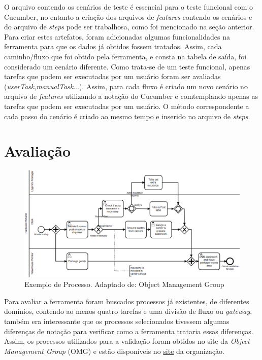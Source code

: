 \documentclass[12pt]{article}
\begin{document}
O arquivo contendo os cenários de teste é essencial para o teste funcional com o Cucumber, no entanto a criação dos arquivos de \emph{features} contendo os cenários e do arquivo de \emph{steps} pode ser trabalhosa, como foi mencionado na seção anterior. Para criar estes artefatos, foram adicionadas algumas funcionalidades na ferramenta para que os dados já obtidos fossem tratados. Assim, cada caminho/fluxo que foi obtido pela ferramenta, e consta na tabela de saída, foi considerado um cenário diferente. Como trata-se de um teste funcional, apenas tarefas que podem ser executadas por um usuário foram ser avaliadas (\emph{userTask},\emph{manualTask}...). Assim, para cada fluxo é criado um novo cenário no arquivo de \emph{features} utilizando a notação do Cucumber e comtemplando apenas as tarefas que podem ser executadas por um usuário. O método correspondente a cada passo do cenário é criado ao mesmo tempo e inserido no arquivo de \emph{steps}. %


\section{Avaliação}
\begin{figure}[ht]
\includegraphics[width=.9\textwidth]{figuras/diagrama_exemplo.png}
\caption{Exemplo de Processo. Adaptado de: Object Management Group}
\label{fig:diagrama_exemplo}
\end{figure}

Para avaliar a ferramenta foram buscados processos já existentes, de diferentes domínios, contendo ao menos quatro tarefas e uma divisão de fluxo ou \emph{gateway}, também era interessante que os processos selecionados tivessem algumas diferenças de notação para verificar como a ferramenta trataria essas diferenças. Assim, os processos utilizados para a validação foram obtidos no site da \emph{Object Management Group} (OMG) e estão disponíveis no \href{http://www.omg.org/spec/BPMN/20100602/2010-06-03/}{site} da organização.
\end{document}
